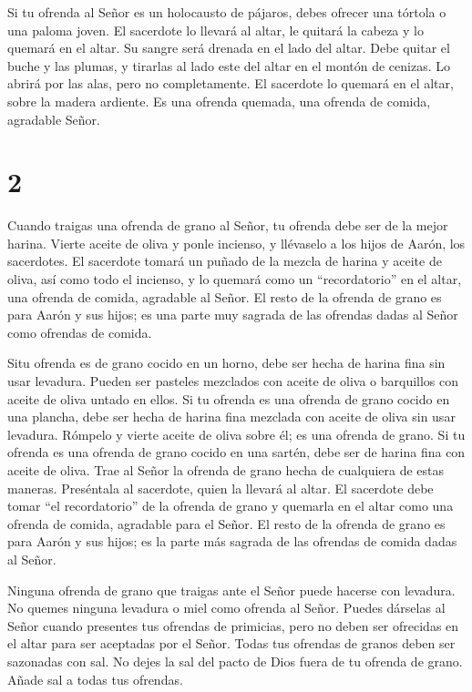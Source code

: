  Si tu ofrenda al Señor es un holocausto de pájaros, debes
ofrecer una tórtola o una paloma joven.  El sacerdote lo
llevará al altar, le quitará la cabeza y lo quemará en el altar. Su
sangre será drenada en el lado del altar.  Debe quitar el
buche y las plumas, y tirarlas al lado este del altar en el montón de
cenizas.  Lo abrirá por las alas, pero no completamente. El
sacerdote lo quemará en el altar, sobre la madera ardiente. Es una
ofrenda quemada, una ofrenda de comida, agradable Señor.

\hypertarget{section-1}{%
\section{2}\label{section-1}}

 Cuando traigas una ofrenda de grano al Señor, tu ofrenda
debe ser de la mejor harina. Vierte aceite de oliva y ponle incienso,
 y llévaselo a los hijos de Aarón, los sacerdotes. El
sacerdote tomará un puñado de la mezcla de harina y aceite de oliva, así
como todo el incienso, y lo quemará como un ``recordatorio'' en el
altar, una ofrenda de comida, agradable al Señor.  El resto
de la ofrenda de grano es para Aarón y sus hijos; es una parte muy
sagrada de las ofrendas dadas al Señor como ofrendas de comida.

 Situ ofrenda es de grano cocido en un horno, debe ser hecha
de harina fina sin usar levadura. Pueden ser pasteles mezclados con
aceite de oliva o barquillos con aceite de oliva untado en ellos.
 Si tu ofrenda es una ofrenda de grano cocido en una
plancha, debe ser hecha de harina fina mezclada con aceite de oliva sin
usar levadura.  Rómpelo y vierte aceite de oliva sobre él;
es una ofrenda de grano.  Si tu ofrenda es una ofrenda de
grano cocido en una sartén, debe ser de harina fina con aceite de oliva.
 Trae al Señor la ofrenda de grano hecha de cualquiera de
estas maneras. Preséntala al sacerdote, quien la llevará al altar.
 El sacerdote debe tomar ``el recordatorio'' de la ofrenda
de grano y quemarla en el altar como una ofrenda de comida, agradable
para el Señor.  El resto de la ofrenda de grano es para
Aarón y sus hijos; es la parte más sagrada de las ofrendas de comida
dadas al Señor.

 Ninguna ofrenda de grano que traigas ante el Señor puede
hacerse con levadura. No quemes ninguna levadura o miel como ofrenda al
Señor.  Puedes dárselas al Señor cuando presentes tus
ofrendas de primicias, pero no deben ser ofrecidas en el altar para ser
aceptadas por el Señor.  Todas tus ofrendas de granos deben
ser sazonadas con sal. No dejes la sal del pacto de Dios fuera de tu
ofrenda de grano. Añade sal a todas tus ofrendas.

